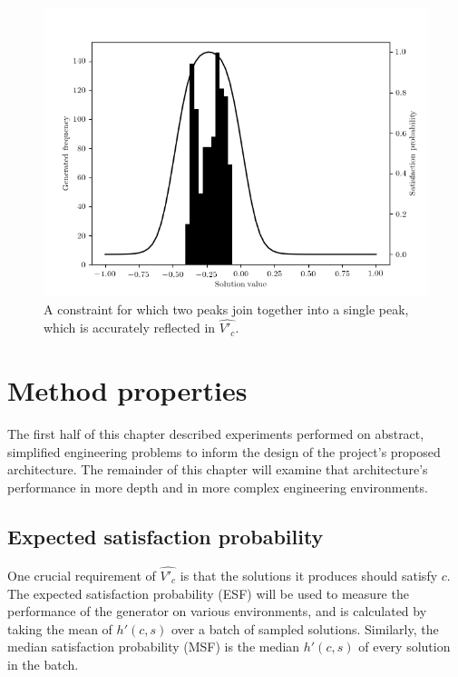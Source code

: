 \documentclass[../../main.tex]{subfiles}
\begin{document}
\begin{figure}[H]
    \begin{center}
    \includegraphics[width=\textwidth]{embeddedConstraint7}
    \caption[Merged viable space modes]{
        A constraint for which two peaks join together into a single peak, which is accurately reflected in $\hat{V'_c}$.
    }
    \label{fig:embeddedConstraintJoinedModes}
    \end{center}
\end{figure}

\section{Method properties} \label{section:methodProperties}

The first half of this chapter described experiments performed on abstract, simplified engineering problems to inform the design of the project's proposed architecture.
The remainder of this chapter will examine that architecture's performance in more depth and in more complex engineering environments.

\subsection{Expected satisfaction probability} \label{subsection:expectedSatisfactionProbability}

One crucial requirement of $\hat{V'_c}$ is that the solutions it produces should satisfy $c$.
The expected satisfaction probability (ESF) will be used to measure the performance of the generator on various environments, and is calculated by taking the mean of $h'(c,s)$ over a batch of sampled solutions.
Similarly, the median satisfaction probability (MSF) is the median $h'(c,s)$ of every solution in the batch.
\end{document}
